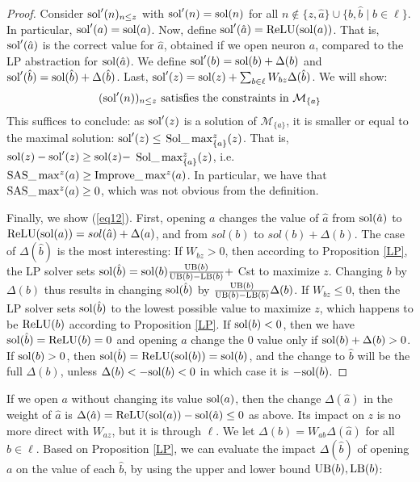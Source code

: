 	
	\begin{proof}
    Consider $\mathrm{sol}'(n)_{n \leq z}$ with
	$\mathrm{sol}'(n)=\mathrm{sol}(n)$ for all $n \notin \{z,\hat{a}\} \cup \{b,\hat{b} \mid b \in \ell\}$. In particular,  $\mathrm{sol}'(a) = \mathrm{sol}(a)$.
	Now, define $\mathrm{sol}'(\hat{a}) = \mathrm{ReLU}(\mathrm{sol}(a))$. 
	That is, $\mathrm{sol}'(\hat{a})$ is the correct value for $\hat{a}$, obtained if we open neuron $a$, compared to the LP abstraction for $\mathrm{sol}(\hat{a})$.
	We define $\mathrm{sol}'(b)=\mathrm{sol}(b)+\Delta(b)$ and 
	$\mathrm{sol}'(\hat{b})=\mathrm{sol}(\hat{b}) + \Delta(\hat{b})$.
	Last, $\mathrm{sol}'(z)=\mathrm{sol}(z) + \sum_{b \in \ell} W_{bz} \Delta(\hat{b})$.
	We will show:
	\begin{equation}
		\label{eq12}
		(\mathrm{sol}'(n))_{n \leq z} \text{ satisfies the constraints in } \mathcal{M}_{\{a\}}
	\end{equation} 
	This suffices to conclude: as
	$\mathrm{sol}'(z)$ is a solution of $\mathcal{M}_{\{a\}}$, it is smaller or equal to the maximal solution: $\mathrm{sol}'(z) \leq$ $\mathrm{Sol}\_\max_{\{a\}}^z(z)$. That is, 
	$\mathrm{sol}(z)-\mathrm{sol}'(z) \geq \mathrm{sol}(z) -$ $\mathrm{Sol}\_\max_{\{a\}}^z(z)$, i.e. 
	$ \mathrm{SAS}\_\max^z(a) \geq \mathrm{Improve}\_\max^z(a)$.
	In particular, we have that $\mathrm{SAS}\_\max^z(a) \geq 0$, which was not obvious from the definition.

	Finally, we show (\ref{eq12}). First, opening $a$ changes the value of $\hat{a}$ from
	$\mathrm{sol}(\hat{a})$ to $\mathrm{ReLU}(\mathrm{sol}(a)) = sol(\hat{a}) + \Delta(a)$, 
	and from $sol(b)$ to $sol(b) + \Delta(b)$.
	The case of $\Delta(\hat{b})$ is the most interesting:
	If $W_{bz}>0$, then according to Proposition \ref{LP}, the LP solver
sets $\mathrm{sol}(\hat{b}) = \mathrm{sol}(b) \frac{\mathrm{UB}(b)}{\mathrm{UB}(b)-\mathrm{LB}(b)} +$ Cst to maximize $z$.
Changing $b$ by $\Delta(b)$ thus results in changing $\mathrm{sol}(\hat{b})$ by 
$\frac{\mathrm{UB}(b)}{\mathrm{UB}(b)-\mathrm{LB}(b)}\Delta(b)$.
If $W_{bz}\leq0$, then the LP solver sets $\mathrm{sol}(\hat{b})$ to the lowest possible value to maximize $z$, which happens to be $\mathrm{ReLU}(b)$ according to Proposition \ref{LP}.
If $\mathrm{sol}(b) < 0$, then we have $\mathrm{sol}(\hat{b})=\mathrm{ReLU}(b)=0$ and opening $a$ change the 0 value only if $\mathrm{sol}(b)+\Delta(b)>0$. If $\mathrm{sol}(b) > 0$, then 
$\mathrm{sol}(\hat{b})=\mathrm{ReLU}(\mathrm{sol}(b))=\mathrm{sol}(b)$, and the change to $\hat{b}$ will be 
the full $\Delta(b)$, unless $\Delta(b) < -\mathrm{sol}(b) < 0$ in which case it is 
$-\mathrm{sol}(b)$.
		\end{proof}


	\iffalse

	If we open $a$ without changing its value $\mathrm{sol}(a)$, then the change $\Delta(\hat{a})$ in the weight of $\hat{a}$ is 
$\Delta(\hat{a})=\mathrm{ReLU}(\mathrm{sol}(a)) - \mathrm{sol}(\hat{a}) \leq 0$ as above. Its impact on $z$ is no more direct with $W_{az}$, but it is through $\ell$. 
We let $\Delta(b) = W_{ab}\Delta(\hat{a})$ for all $b \in \ell$.
Based on Proposition \ref{LP}, we can evaluate the impact 
$\Delta(\hat{b})$ of opening $a$ on the value of each $\hat{b}$, by using the upper and lower bound $\mathrm{UB}(b),\mathrm{LB}(b)$:

